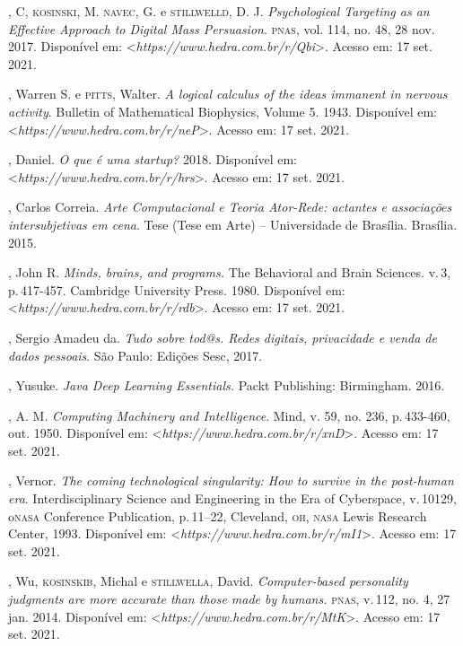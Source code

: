\begin{bibliohedra}
, C, \textsc{kosinski}, M. \textsc{navec}, G. e \textsc{stillwelld}, D. J.
\emph{Psychological Targeting as an Effective Approach to Digital Mass
Persuasion}. \textsc{pnas}, vol. 114, no. 48, 28 nov. 2017. Disponível em:
\textless{}\emph{https://www.hedra.com.br/r/Qbi}\textgreater{}. Acesso em: 17 set. 2021.

, Warren S. e \textsc{pitts}, Walter. \emph{A logical calculus of the
ideas immanent in nervous activity}. Bulletin of Mathematical
Biophysics, Volume 5. 1943. Disponível em:
\textless{}\emph{https://www.hedra.com.br/r/neP}\textgreater{}. Acesso em: 17 set. 2021.

, Daniel. \emph{O que é uma startup?} 2018. Disponível em:
\textless{}\emph{https://www.hedra.com.br/r/hrs}\textgreater{}. Acesso em: 17 set. 2021.

, Carlos Correia. \emph{Arte Computacional e Teoria Ator-Rede:
actantes e associações intersubjetivas em cena}. Tese (Tese em Arte) --
Universidade de Brasília. Brasília. 2015.

, John R. \emph{Minds, brains, and programs.} The Behavioral and
Brain Sciences. v.\,3, p.\,417-457. Cambridge University Press. 1980.
Disponível em: \textless{}\emph{https://www.hedra.com.br/r/rdb}\textgreater{}. Acesso em: 17 set. 2021.

, Sergio Amadeu da. \emph{Tudo sobre tod@s. Redes digitais,
privacidade e venda de dados pessoais}. São Paulo: Edições Sesc, 2017.

, Yusuke. \emph{Java Deep Learning Essentials.} Packt
Publishing: Birmingham. 2016.

, A. M. \emph{Computing Machinery and Intelligence}. Mind, v.
59, no. 236, p.\,433-460, out. 1950. Disponível em: \textless{}\emph{https://www.hedra.com.br/r/xnD}\textgreater{}. Acesso em: 17 set. 2021.

, Vernor. \emph{The coming technological singularity: How to
survive in the post-human era}. Interdisciplinary Science and
Engineering in the Era of Cyberspace, v.\,10129, o\textsc{nasa} Conference
Publication, p.\,11--22, Cleveland, \textsc{oh}, \textsc{nasa} Lewis Research Center,
1993. Disponível em: \textless{}\emph{https://www.hedra.com.br/r/mI1}\textgreater{}. Acesso em: 17 set. 2021.

, Wu, \textsc{kosinskib}, Michal e \textsc{stillwella}, David.
\emph{Computer-based personality judgments are more accurate than
those made by humans.} \textsc{pnas}, v.\,112, no. 4, 27 jan. 2014. Disponível em:
\textless{}\emph{https://www.hedra.com.br/r/MtK}\textgreater{}. Acesso em: 17 set. 2021.
\end{bibliohedra}


